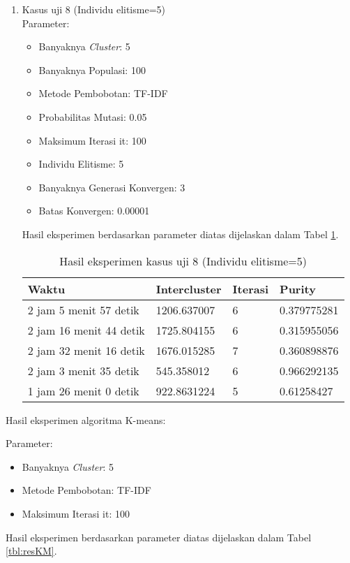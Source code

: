 \begin{enumerate}
	\item Kasus uji 8 (Individu elitisme=5)\\
	Parameter:
	\begin{itemize}
		\item Banyaknya \textit{Cluster}: 5
		\item Banyaknya Populasi: 100
		\item Metode Pembobotan: TF-IDF
		\item Probabilitas Mutasi: 0.05
		\item Maksimum Iterasi it: 100
		\item Individu Elitisme: 5
		\item Banyaknya Generasi Konvergen: 3
		\item Batas Konvergen: 0.00001
	\end{itemize}
	Hasil eksperimen berdasarkan parameter diatas dijelaskan dalam Tabel \ref{tbl:res8}.
	\begin{table}[H]
		\centering
		\begin{tabular}{|l|l|l|l|} \hline
			Waktu & Intercluster & Iterasi & Purity \\ \hline
			2 jam 5 menit 57 detik  & 1206.637007 & 6 & 0.379775281 \\ \hline
			2 jam 16 menit 44 detik & 1725.804155 & 6 & 0.315955056 \\ \hline
			2 jam 32 menit 16 detik & 1676.015285 & 7 & 0.360898876 \\ \hline
			2 jam 3 menit 35 detik  & 545.358012  & 6 & 0.966292135 \\ \hline
			1 jam 26 menit 0 detik  & 922.8631224 & 5 & 0.61258427 \\ \hline
		\end{tabular}
		\caption{Hasil eksperimen kasus uji 8 (Individu elitisme=5)}
		\label{tbl:res8}
	\end{table}
\end{enumerate}

Hasil eksperimen algoritma K-means:

Parameter:
\begin{itemize}
	\item Banyaknya \textit{Cluster}: 5
	\item Metode Pembobotan: TF-IDF
	\item Maksimum Iterasi it: 100
\end{itemize}

Hasil eksperimen berdasarkan parameter diatas dijelaskan dalam Tabel \ref{tbl:resKM}.

